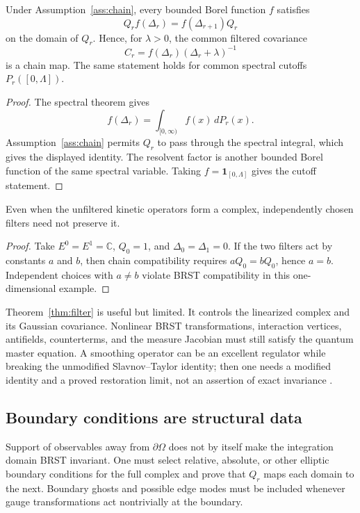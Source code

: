 \documentclass[11pt]{article}
\newcommand{\Om}{\Omega}
\begin{document}
\begin{theorem}\label{thm:filter}
Under Assumption~\ref{ass:chain}, every bounded Borel function $f$ satisfies
\[
 Q_rf(\Delta_r)=f(\Delta_{r+1})Q_r
\]
on the domain of $Q_r$.  Hence, for $\lambda>0$, the common filtered covariance
\[
 C_r=f(\Delta_r)(\Delta_r+\lambda)^{-1}
\]
is a chain map.  The same statement holds for common spectral cutoffs
$P_r([0,\Lambda])$.
\end{theorem}

\begin{proof}
The spectral theorem gives
\[
 f(\Delta_r)=\int_{[0,\infty)}f(x)\,dP_r(x).
\]
Assumption~\ref{ass:chain} permits $Q_r$ to pass through the spectral integral,
which gives the displayed identity.  The resolvent factor is another bounded
Borel function of the same spectral variable.  Taking
$f=\mathbf 1_{[0,\Lambda]}$ gives the cutoff statement.
\end{proof}

\begin{proposition}\label{prop:independent}
Even when the unfiltered kinetic operators form a complex, independently
chosen filters need not preserve it.
\end{proposition}

\begin{proof}
Take $E^0=E^1=\mathbb C$, $Q_0=1$, and
$\Delta_0=\Delta_1=0$.  If the two filters act by constants $a$ and $b$, then
chain compatibility requires $aQ_0=bQ_0$, hence $a=b$.  Independent choices
with $a\ne b$ violate BRST compatibility in this one-dimensional example.
\end{proof}

Theorem~\ref{thm:filter} is useful but limited.  It controls the linearized
complex and its Gaussian covariance.  Nonlinear BRST transformations,
interaction vertices, antifields, counterterms, and the measure Jacobian must
still satisfy the quantum master equation.  A smoothing operator can be an
excellent regulator while breaking the unmodified Slavnov--Taylor identity;
then one needs a modified identity and a proved restoration limit, not an
assertion of exact invariance \cite{Lavrov2020}.

\subsection{Boundary conditions are structural data}

Support of observables away from $\partial\Om$ does not by itself make the
integration domain BRST invariant.  One must select relative, absolute, or
other elliptic boundary conditions for the full complex and prove that $Q_r$
maps each domain to the next.  Boundary ghosts and possible edge modes must be
included whenever gauge transformations act nontrivially at the boundary.
\end{document}

